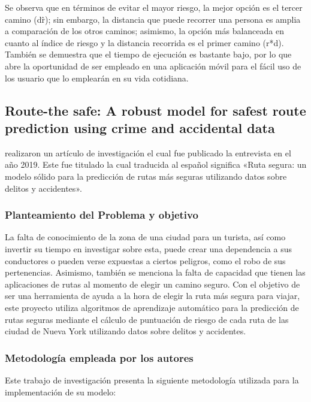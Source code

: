 
Se observa que en términos de evitar el mayor riesgo, la mejor opción es el tercer camino (d\^r); sin embargo, la distancia que puede recorrer una persona es amplia a comparación de los otros caminos; asimismo, la opción más balanceada en cuanto al índice de riesgo y la distancia recorrida es el primer camino (r*d). También se demuestra que el tiempo de ejecución es bastante bajo, por lo que abre la oportunidad de ser empleado en una aplicación móvil para el fácil uso de los usuario que lo emplearán en su vida cotidiana.


\subsection{Route-the safe: A robust model for safest route prediction using crime and accidental data \citep*{pr_dehghani2018copper}}
\citeauthor{pr_dehghani2018copper} realizaron un artículo de investigación el cual fue publicado la entrevista en el año 2019. Este fue titulado  la cual traducida al español significa «Ruta segura: un modelo sólido para la predicción de rutas más seguras utilizando datos sobre delitos y accidentes».

\subsubsection{Planteamiento del Problema y objetivo }
La falta de conocimiento de la zona de una ciudad para un turista, así como invertir su tiempo en investigar sobre esta, puede crear una dependencia a sus conductores o pueden verse expuestas a ciertos peligros, como el robo de sus pertenencias. Asimismo, también se menciona la falta de capacidad que tienen las aplicaciones de rutas al momento de elegir un camino seguro. Con el objetivo de ser una herramienta de ayuda a la hora de elegir la ruta más segura para viajar, este proyecto  utiliza algoritmos de aprendizaje automático para la predicción de rutas seguras mediante el cálculo de puntuación de riesgo de cada ruta de las ciudad de Nueva York utilizando datos sobre delitos y accidentes.
\subsubsection{Metodología empleada por los autores}
Este trabajo de investigación presenta la siguiente metodología utilizada para la implementación de su modelo:

